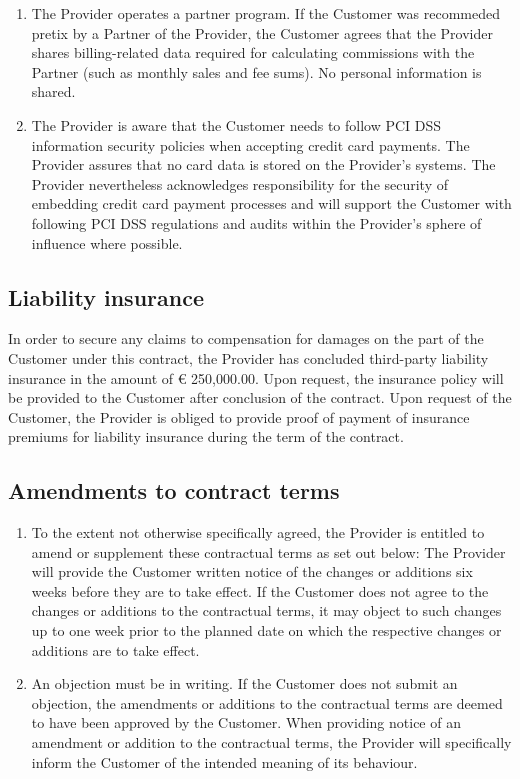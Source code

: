 \documentclass{terms}
\begin{document}
\begin{enumerate}
\item The Provider operates a partner program. If the Customer was recommeded pretix by a Partner of the Provider, the Customer agrees that the Provider shares billing-related data required for calculating commissions with the Partner (such as monthly sales and fee sums). No personal information is shared.
\item The Provider is aware that the Customer needs to follow PCI DSS information security policies when accepting credit card payments. The Provider assures that no card data is stored on the Provider’s systems. The Provider nevertheless acknowledges responsibility for the security of embedding credit card payment processes and will support the Customer with following PCI DSS regulations and audits within the Provider’s sphere of influence where possible.
\end{enumerate}
\subsection{Liability insurance}
In order to secure any claims to compensation for damages on the part of the Customer under this contract, the Provider has concluded third-party liability insurance in the amount of € 250,000.00. Upon request, the insurance policy will be provided to the Customer after conclusion of the contract. Upon request of the Customer, the Provider is obliged to provide proof of payment of insurance premiums for liability insurance during the term of the contract.
\subsection{Amendments to contract terms}
\begin{enumerate}
\item To the extent not otherwise specifically agreed, the Provider is entitled to amend or supplement these contractual terms as set out below: The Provider will provide the Customer written notice of the changes or additions six weeks before they are to take effect. If the Customer does not agree to the changes or additions to the contractual terms, it may object to such changes up to one week prior to the planned date on which the respective changes or additions are to take effect. 
\item An objection must be in writing. If the Customer does not submit an objection, the amendments or additions to the contractual terms are deemed to have been approved by the Customer. When providing notice of an amendment or addition to the contractual terms, the Provider will specifically inform the Customer of the intended meaning of its behaviour.
\end{enumerate}
\end{document}
